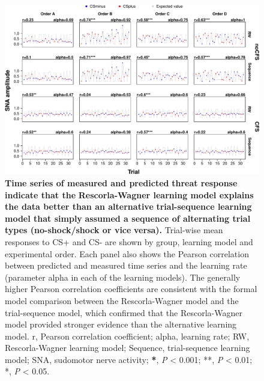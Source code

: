 \documentclass[12pt]{article}
\begin{document}
\begin{figure}[htbp]
\centering
\includegraphics[width=1.0\textwidth]{cfs_modelfits-crop.pdf}
\caption{\label{fig:org918e8f8}
\textbf{Time series of measured and predicted} \textbf{threat response indicate that the} \textbf{Rescorla-Wagner learning model explains} \textbf{the data better than an alternative} \textbf{trial-sequence learning model that simply} \textbf{assumed a sequence of alternating trial} \textbf{types (no-shock/shock or vice} \textbf{versa).} Trial-wise mean responses to CS+ and CS- are shown by group, learning model and experimental order. Each panel also shows the Pearson correlation between predicted and measured time series and the learning rate (parameter alpha in each of the learning models). The generally higher Pearson correlation coefficients are consistent with the formal model comparison between the Rescorla-Wagner model and the trial-sequence model, which confirmed that the Rescorla-Wagner model provided stronger evidence than the alternative learning model. r, Pearson correlation coefficient; alpha, learning rate; RW, Rescorla-Wagner learning model; Sequence, trial-sequence learning model; SNA, sudomotor nerve activity; \textbf{*}, \emph{P} < 0.001; **, \emph{P} < 0.01; *, \emph{P} < 0.05.}
\end{figure}
\end{document}
